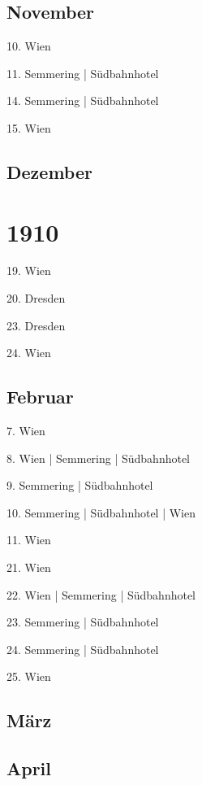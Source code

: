 \documentclass[twoside=false,titlepage=false,open=any, parskip=never, fontsize=10pt, headings=small, chapterprefix=false, appendixprefix=false, DIV=15]{scrbook}
\begin{document}
\begin{multicols}{3}
            \section*{November}
            10. Wien\par
            11. Semmering | Südbahnhotel\par
            14. Semmering | Südbahnhotel\par
            15. Wien\par
            \section*{Dezember}
            \chapter*{1910}
            19. Wien\par
            20. Dresden\par
            23. Dresden\par
            24. Wien\par
            \section*{Februar}
            7. Wien\par
            8. Wien | Semmering | Südbahnhotel\par
            9. Semmering | Südbahnhotel\par
            10. Semmering | Südbahnhotel | Wien\par
            11. Wien\par
            21. Wien\par
            22. Wien | Semmering | Südbahnhotel\par
            23. Semmering | Südbahnhotel\par
            24. Semmering | Südbahnhotel\par
            25. Wien\par
            \section*{März}
            \section*{April}

\end{multicols}
\end{document}
